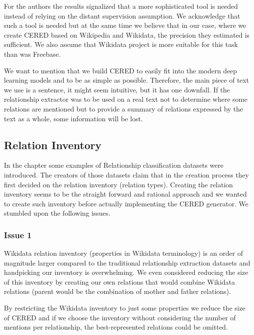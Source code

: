 For the authors the results signalized that a more sophisticated tool is needed instead of relying on the distant supervision assumption. We acknowledge that such a tool is needed but at the same time we believe that in our case, where we create CERED based on Wikipedia and Wikidata, the precision they estimated is sufficient. We also assume that Wikidata project is more suitable for this task than was Freebase.

We want to mention that we build CERED to easily fit into the modern deep learning models and to be as simple as possible. Therefore, the main piece of text we use is a sentence, it might seem intuitive, but it has one downfall. If the relationship extractor was to be used on a real text not to determine where some relations are mentioned but to provide a summary of relations expressed by the text as a whole, some information will be lost. 


\subsection{Relation Inventory}
In the  chapter some examples of Relationship classification datasets were introduced. The creators of those datasets claim that in the creation process they first decided on the relation inventory (relation types).  Creating the relation inventory seems to be the straight forward and rational approach and we wanted to create such inventory before actually implementing the CERED generator. We stumbled upon the following issues.

\subsubsection{Issue 1}Wikidata relation inventory (properties in Wikidata terminology) is an order of magnitude larger compared to the traditional relationship extraction datasets and handpicking our inventory is overwhelming. We even considered reducing the size of this inventory by creating our own relations that would combine Wikidata relations (parent would be the combination of mother and father relations). 

By restricting the Wikidata inventory to just some properties we reduce the size of CERED and if we choose the inventory without considering the number of mentions per relationship, the best-represented relations could be omitted.

